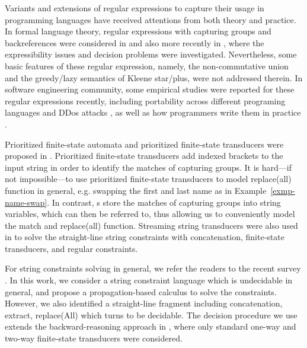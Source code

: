 Variants and extensions of regular expressions to capture their usage in programming languages have received attentions %
from both theory and practice. In formal language theory, regular expressions with capturing groups and backreferences were considered in \cite{CSY03,CN09} and also more recently in \cite{Freydenberger13,Schmid16,BM17b,FS19}, where the expressibility issues and decision problems were investigated. Nevertheless, some basic features of these regular expression, namely, the non-commutative union and the greedy/lazy semantics of Kleene star/plus, were not addressed therein. In software engineering community, %
some empirical studies were reported for these regular expressions recently, including portability across different programing languages \cite{DMC+19} and DDos attacks \cite{SP18}, as well as how programmers write them in practice \cite{MDD+19}.


Prioritized finite-state automata and prioritized finite-state transducers were proposed in \cite{BM17}. Prioritized finite-state transducers add indexed brackets to the input string in order to identify the matches of capturing groups. It is hard---if not impossible---to use prioritized finite-state transducers to model replace(all) function in general, e.g. swapping the first and last name as in Example~\ref{exmp-name-swap}. In contrast, {\PSST}s store the matches of capturing groups into string variables, which can then be referred to, thus allowing us to conveniently model the match and replace(all) function. 
%
Streaming string transducers were also used in \cite{ZAM19} to solve the straight-line string constraints with concatenation, finite-state transducers, and regular constraints.

For string constraints solving in general, we refer the readers to the recent survey \cite{Ama20}. In this work, we consider a string constraint language which is undecidable in general, and propose a propagation-based calculus to solve the constraints. However, we also identified a straight-line fragment including concatenation, extract, replace(All) which turns to be decidable. The decision procedure we use extends the backward-reasoning approach in \cite{CHL+19}, where only standard one-way and two-way finite-state transducers were considered. 
